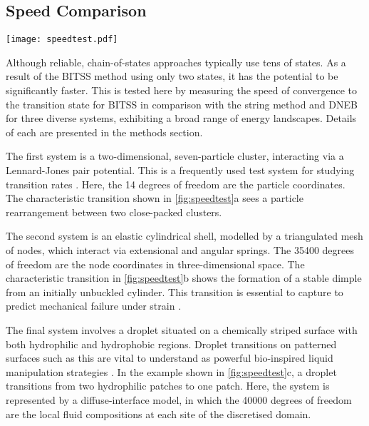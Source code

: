 \documentclass[twocolumn,10pt]{revtex4}
\begin{document}
\subsection{Speed Comparison}
\begin{figure*}[tb]
  \texttt{[image: speedtest.pdf]}
  \caption{\label{fig:speedtest}
    Comparisons between BITSS, DNEB, and the string method in the convergence to the transition state as a function of the number of calculations of the energy gradient.
    Three test systems are used: (a) a Lennard-Jones seven-particle cluster, (b) cylindrical shell buckling, and (c) wetting of a chemically-striped surface.
    The configurations shown correspond to the two minimum energy states and the transition state, marked by an asterisk.
    The string method and DNEB are repeated with a differing number of images, as listed in the legend in (c).
  }
\end{figure*}

Although reliable, chain-of-states approaches typically use tens of states.
As a result of the BITSS method using only two states, it has the potential to be significantly faster.
This is tested here by measuring the speed of convergence to the transition state for BITSS in comparison with the string method and DNEB for three diverse systems, exhibiting a broad range of energy landscapes.
Details of each are presented in the methods section.

The first system is a two-dimensional, seven-particle cluster, interacting via a Lennard-Jones pair potential.
This is a frequently used test system for studying transition rates \cite{Wales2002,Passerone2001}.
Here, the \num{14} degrees of freedom are the particle coordinates.
The characteristic transition shown in \cref{fig:speedtest}a sees a particle rearrangement between two close-packed clusters.

The second system is an elastic cylindrical shell, modelled by a triangulated mesh of nodes, which interact via extensional and angular springs.
The \num{35400} degrees of freedom are the node coordinates in three-dimensional space.
The characteristic transition in \cref{fig:speedtest}b shows the formation of a stable dimple from an initially unbuckled cylinder.
This transition is essential to capture to predict mechanical failure under strain \cite{Panter2019,Virot2017}.

The final system involves a droplet situated on a chemically striped surface with both hydrophilic and hydrophobic regions.
Droplet transitions on patterned surfaces such as this are vital to understand as powerful bio-inspired liquid manipulation strategies  \cite{Kusumaatmaja2006,Brown2016}.
In the example shown in \cref{fig:speedtest}c, a droplet transitions from two hydrophilic patches to one patch.
Here, the system is represented by a diffuse-interface model, in which the \num{40000} degrees of freedom are the local fluid compositions at each site of the discretised domain.
\end{document}

